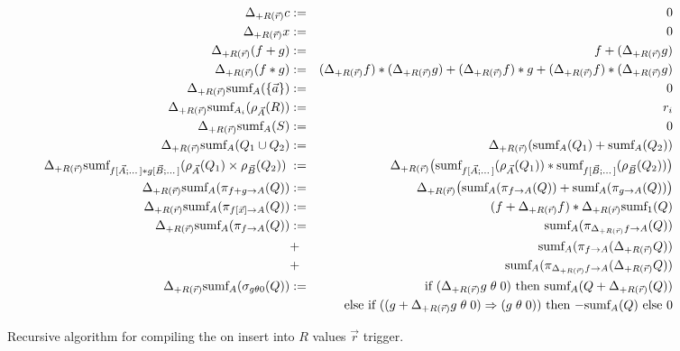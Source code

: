 \begin{figure*}[t!]
\begin{eqnarray*}
\Delta_{+R(\vec{r})} c       &:=& 0 \\
\Delta_{+R(\vec{r})} x       &:=& 0 \\
\Delta_{+R(\vec{r})} (f + g) &:=&         f                + (\Delta_{+R(\vec{r})} g) \\
\Delta_{+R(\vec{r})} (f * g) &:=& (\Delta_{+R(\vec{r})} f) * (\Delta_{+R(\vec{r})} g) 
                              +   (\Delta_{+R(\vec{r})} f) * g                        
                              +   (\Delta_{+R(\vec{r})} f) * (\Delta_{+R(\vec{r})} g)
\\
\Delta_{+R(\vec{r})} \mbox{sumf}_A(\{ \vec{a} \}) &:=& 0
\\
\Delta_{+R(\vec{r})} \mbox{sumf}_{A_i}(\rho_{\vec{A}}(R)) &:=& r_i
\\
\Delta_{+R(\vec{r})} \mbox{sumf}_A(S) &:=& 0
\\
\Delta_{+R(\vec{r})}  \mbox{sumf}_A(Q_1 \cup Q_2) &:=&
\Delta_{+R(\vec{r})} (\mbox{sumf}_A(Q_1) + \mbox{sumf}_A(Q_2))
\\
\Delta_{+R(\vec{r})} \mbox{sumf}_{f[\vec{A};\dots] * g[\vec{B};\dots]}(\rho_{\vec{A}}(Q_1) \times \rho_{\vec{B}}(Q_2)) \; &:=&
\Delta_{+R(\vec{r})} \big( \mbox{sumf}_{f[\vec{A};\dots]}(\rho_{\vec{A}}(Q_1))
    * \mbox{sumf}_{f[\vec{B};\dots]}(\rho_{\vec{B}}(Q_2)) \big)
\\
\Delta_{+R(\vec{r})} \mbox{sumf}_A(\pi_{f + g \rightarrow A}(Q)) &:=&
\Delta_{+R(\vec{r})} \big( \mbox{sumf}_A(\pi_{f \rightarrow A}(Q))
   + \mbox{sumf}_A(\pi_{g \rightarrow A}(Q)) \big)
\\
\Delta_{+R(\vec{r})} \mbox{sumf}_A(\pi_{f[\vec{x}] \rightarrow A}(Q)) &:=&
   (f + \Delta_{+R(\vec{r})} f)
   * \Delta_{+R(\vec{r})} \mbox{sumf}_1(Q)
\\
\Delta_{+R(\vec{r})} \mbox{sumf}_A(\pi_{f \rightarrow A}(Q)) &:=&
   \mbox{sumf}_A(\pi_{\Delta_{+R(\vec{r})} f \rightarrow A}(Q)) \\
   &+& \mbox{sumf}_A(\pi_{f \rightarrow A}(\Delta_{+R(\vec{r})} Q)) \\
   &+& \mbox{sumf}_A(\pi_{\Delta_{+R(\vec{r})} f \rightarrow A}(\Delta_{+R(\vec{r})} Q))
\\
\Delta_{+R(\vec{r})} \mbox{sumf}_A(\sigma_{g \theta 0}(Q)) &:=&
\mbox{if ($\Delta_{+R(\vec{r})} g \;\theta\; 0$) then
   $\mbox{sumf}_A(Q + \Delta_{+R(\vec{r})}(Q))$} \\
&& \mbox{else if ($(g + \Delta_{+R(\vec{r})} g \;\theta\; 0) \Rightarrow
(g \;\theta\; 0)$) then $- \mbox{sumf}_A(Q)$ else 0}
\end{eqnarray*}
%
\caption{Recursive algorithm for compiling the
on insert into $R$ values $\vec{r}$ trigger.}
\label{fig:mainalg}
\end{figure*}


